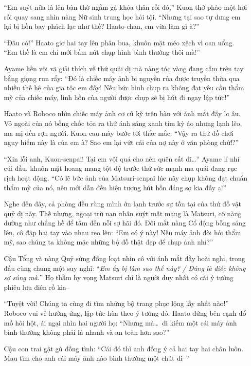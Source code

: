 \documentclass[../main.tex]{subfiles}
\begin{document}
``Em suýt nữa là lên bàn thờ ngắm gà khỏa thân rồi đó,'' Kuon thở phào một hơi rồi quay sang nhìn nàng Nữ sinh trung học hỏi tội. ``Nhưng tại sao tự dưng em lại bị hồn bay phách lạc như thế? Haato-chan, em vừa làm gì à?''

``Đâu có!'' Haato giơ hai tay lên phân bua, khuôn mặt méo xệch vì oan uổng. ``Em thề là em chỉ mới bấm nút chụp hình bình thường thôi mà!''

Ayame liền vội vã giải thích về thứ quái dị mà nàng tóc vàng đang cầm trên tay bằng giọng run rẩy: ``Đó là chiếc máy ảnh bị nguyền rủa được truyền thừa qua nhiều thế hệ của gia tộc em đấy! Nếu bức hình chụp ra không đạt yêu cầu thẩm mỹ của chiếc máy, linh hồn của người được chụp sẽ bị hút đi ngay lập tức!''


Haato và Roboco nhìn chiếc máy ảnh cơ cũ kỹ trên bàn với ánh mắt đầy lo âu. Vỏ ngoài của nó bỗng chốc tỏa ra thứ ánh sáng xanh tím kỳ ảo nhưng lạnh lẽo, ma mị đến rợn người. Kuon cau mày bước tới thắc mắc: ``Vậy ra thứ đồ chơi nguy hiểm này là của em à? Sao em lại vứt cái của nợ này ở văn phòng chứ!?''

``Xin lỗi anh, Kuon-senpai! Tại em vội quá cho nên quên cất đi\dots'' Ayame lí nhí cúi đầu, khuôn mặt hoang mang tột độ trước thứ sức mạnh ma quái đang rục rịch hoạt động. ``Có lẽ bức ảnh của Matsuri-senpai lúc nãy chụp không đạt chuẩn thẩm mỹ của nó, nên mới dẫn đến hiện tượng hút hồn đáng sợ kia đấy ạ!''

Nghe đến đây, cả phòng đều rùng mình ớn lạnh trước sự tồn tại của thứ đồ vật quỷ dị này. Thế nhưng, ngoại trừ nạn nhân suýt mất mạng là Matsuri, cô nàng dường như chẳng hề để tâm đến nỗi sợ hãi đó. Đôi mắt nàng Cổ động bỗng sáng lên, cô đập hai tay vào nhau reo lên: ``Em có ý này! Nếu máy ảnh đòi hỏi thẩm mỹ, sao chúng ta không mặc những bộ đồ thật đẹp để chụp ảnh nhỉ?''

Cậu Tổng và nàng Quỷ sừng đồng loạt nhìn cô với ánh mắt đầy hoài nghi, trong đầu cùng chung một suy nghĩ: ``\textit{Em ấy bị làm sao thế này? / Đúng là điếc không sợ súng mà.}'' Họ thầm hy vọng Matsuri chỉ là người duy nhất có cái ý tưởng phiêu lưu điên rồ kia--

``Tuyệt vời! Chúng ta cùng đi tìm những bộ trang phục lộng lẫy nhất nào!'' Roboco vui vẻ hưởng ứng, lập tức hùa theo ý tưởng đó. Haato đứng bên cạnh đổ mồ hôi hột, ái ngại nhìn hai người họ: ``Nhưng mà\dots\ đi kiếm một cái máy ảnh bình thường không phải là nhanh và an toàn hơn sao?''

Cậu con trai gật gù đồng tình: ``Cái đó thì anh đồng ý cả hai tay hai chân luôn. Mau tìm cho anh cái máy ảnh nào bình thường một chút đi--''
\end{document}
